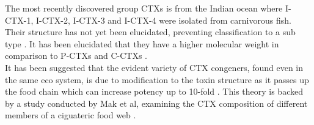 \documentclass[12pt]{article}
\begin{document}
The most recently discovered group CTXs is from the Indian ocean where I-CTX-1, I-CTX-2, I-CTX-3 and I-CTX-4 were isolated from carnivorous fish. Their structure has not yet been elucidated, preventing classification to a sub type \cite{hamilton2002multiple,hamilton2002isolation}. It has been elucidated that they have a higher molecular weight in comparison to P-CTXs and C-CTXs \cite{caillaud2010update,hamilton2002multiple,hamilton2002isolation}. \\ %

It has been suggested that the evident variety of CTX congeners, found even in the same eco system, is due to modification to the toxin structure as it passes up the food chain which can increase potency up to 10-fold \cite{hokama1996human,lewis2006ciguatera}. This theory is backed by a study conducted by Mak et al, examining the CTX composition of different members of a ciguateric food web \cite{mak2013pacific}.

\end{document}
